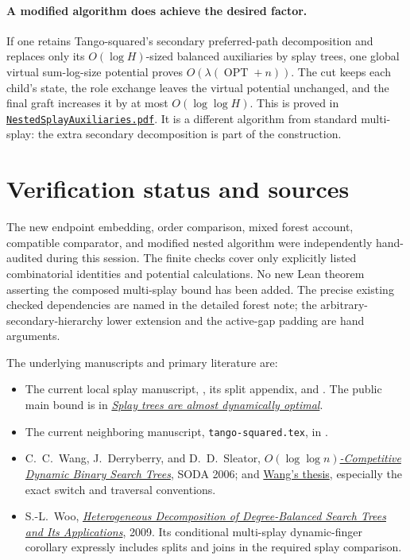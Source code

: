 \documentclass[11pt]{article}
\newcommand{\OPT}{\operatorname{OPT}}
\begin{document}
\paragraph{A modified algorithm does achieve the desired factor.}
If one retains Tango-squared's secondary preferred-path decomposition
and replaces only its $O(\log H)$-sized balanced auxiliaries by splay
trees, one global virtual sum-log-size potential proves
$O(\lambda(\OPT+n))$. The cut keeps each child's state, the role
exchange leaves the virtual potential unchanged, and the final graft
increases it by at most $O(\log\log H)$. This is proved in
\href{NestedSplayAuxiliaries.pdf}{\texttt{NestedSplayAuxiliaries.pdf}}.
It is a different algorithm from standard multi-splay: the extra
secondary decomposition is part of the construction.

\section{Verification status and sources}

The new endpoint embedding, order comparison, mixed forest account,
compatible comparator, and modified nested algorithm were independently
hand-audited during this session. The finite checks cover only explicitly
listed combinatorial identities and potential calculations. No new
Lean theorem asserting the composed multi-splay bound has been added.
The precise existing checked dependencies are named in the detailed
forest note; the arbitrary-secondary-hierarchy lower extension and
the active-gap padding are hand arguments.

The underlying manuscripts and primary literature are:
\begin{itemize}
\item The current local splay manuscript, , its
split appendix, and .
The public main bound is in
\href{https://arxiv.org/abs/2607.18498}{\emph{Splay trees are almost dynamically optimal}}.
\item The current neighboring manuscript, \texttt{tango-squared.tex},
in .
\item C.~C.~Wang, J.~Derryberry, and D.~D.~Sleator,
\href{https://www.cs.cmu.edu/~jonderry/multi-splay.pdf}{\emph{$O(\log\log n)$-Competitive Dynamic Binary Search Trees}}, SODA 2006;
and \href{https://www.csd.cmu.edu/sites/default/files/phd-thesis/CMU-CS-06-140.pdf}{Wang's thesis}, especially the exact switch and traversal conventions.
\item S.-L.~Woo,
\href{https://csd.cs.cmu.edu/sites/default/files/phd-thesis/CMU-CS-09-133.pdf}{\emph{Heterogeneous Decomposition of Degree-Balanced Search Trees and Its Applications}}, 2009.
Its conditional multi-splay dynamic-finger corollary expressly includes
splits and joins in the required splay comparison.
\end{itemize}
\end{document}

